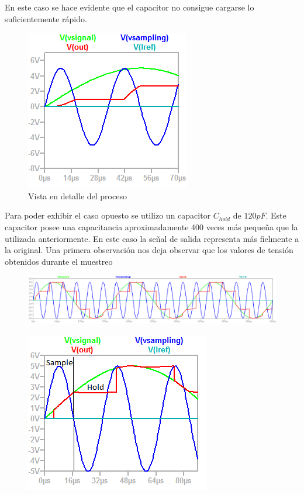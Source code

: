 En este caso se hace evidente que el capacitor no consigue cargarse lo suficientemente rápido.

\begin{figure}[H]
	\centering
	\includegraphics[]{ImagenesEjercicio4/ChTests/Vin1_30ksamplig47nFZoom}
	\caption{Vista en detalle del proceso}
	\label{fig:vin130ksamplig47nfzoom}
\end{figure}

Para poder exhibir el caso opuesto se utilizo un capacitor $C_{hold}$ de $120pF$. Este capacitor posee una capacitancia aproximadamente 400 veces más pequeña que la utilizada anteriormente.
En este caso la señal de salida representa más fielmente a la original. Una primera observación nos deja observar que los valores de tensión obtenidos durante el muestreo  

\begin{figure}[H]
	\centering
	\includegraphics[width=\linewidth]{ImagenesEjercicio4/ChTests/Vin1_30ksamplig120pF}
	\caption{}
	\label{fig:vin130ksamplig120pf}
\end{figure}


\begin{figure}[H]
	\centering
	\includegraphics[]{ImagenesEjercicio4/ChTests/Vin1_30ksamplig120pFZoom2}
	\caption{}
	\label{fig:vin130ksamplig120pfzoom}
\end{figure}


